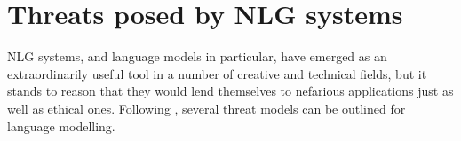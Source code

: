 \section{Threats posed by NLG systems}
\label{sec:mainideas}

NLG systems, and language models in particular, have emerged as an extraordinarily useful tool in a number of creative and technical fields, but it stands to reason that they would lend themselves to nefarious applications just as well as ethical ones.
Following \citealp{crothers2023machinegeneratedtextcomprehensive}, several threat models \citep{shostack2014security} can be outlined for language modelling.